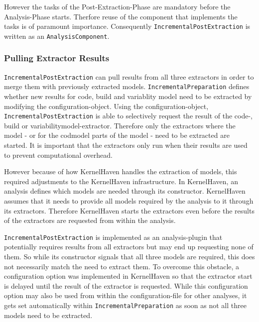 \documentclass[a4paper]{article}
\begin{document}
However the tasks of the Post-Extraction-Phase are mandatory before the Analysis-Phase starts. Therfore reuse of the component that implements the tasks is of paramount importance. Consequently \texttt{Incremental\-Post\-Extraction} is written as an \texttt{Analysis\-Component}.

\subsubsection{Pulling Extractor Results}

\texttt{Incremental\-Post\-Extraction} can pull results from all three extractors in order to merge them with previously extracted models. \texttt{Incremental\-Preparation} defines whether new results for code, build and variablity model need to be extracted by modifying the configuration-object. Using the configuration-object, \texttt{Incremental\-Post\-Extraction} is able to selectively request the result of the code-, build or variabilitymodel-extractor. Therefore only the extractors where the model - or for the codmodel parts of the model - need to be extracted are started. It is important that the extractors only run when their results are used to prevent computational overhead.

However because of how KernelHaven handles the extraction of models, this required adjustments to the KernelHaven infrastructure. In KernelHaven, an analysis defines which models are needed through its constructor. KernelHaven assumes that it needs to provide all models required by the analysis to it through its extractors. Therefore KernelHaven starts the extractors even before the results of the extractors are requested from within the analysis. 

\texttt{Incremental\-Post\-Extraction} is implemented as an analysis-plugin that potentially requires results from all extractors but may end up requesting none of them. So while its constructor signals that all three models are required, this does not necessarily match the need to extract them. To overcome this obstacle, a configuration option was implemented in KernelHaven so that the extractor start is delayed until the result of the extractor is requested. While this configuration option may also be used from within the configuration-file for other analyses, it gets set automatically within \texttt{Incremental\-Preparation} as soon as not all three models need to be extracted.
\end{document}
